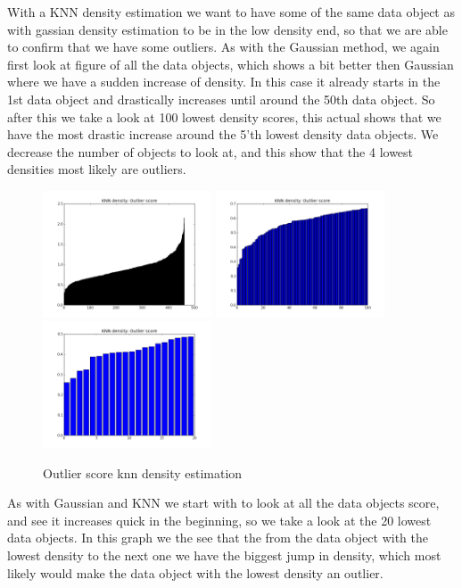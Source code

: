 With a KNN density estimation we want to have some of the same data object as with gassian density estimation to be in the low density end, so that we are able to confirm that we have some outliers. As with the Gaussian method, we again first look at figure of all the data objects, which shows a bit better then Gaussian where we have a sudden increase of density. In this case it already starts in the 1st data object and drastically increases until around the 50th data object. So after this we take a look at 100 lowest density scores, this actual shows that we have the most drastic increase around the 5'th lowest density data objects. We decrease the number of objects to look at, and this show that the 4 lowest densities most likely are outliers.

\begin{figure}[H]
\centering
\includegraphics[width=5cm, keepaspectratio=true]{pictures/knndensityEstimationAll.png}
\includegraphics[width=5cm, keepaspectratio=true]{pictures/knndensityEstimation100.png}
\includegraphics[width=5cm, keepaspectratio=true]{pictures/knndensityEstimation20.png}
\vspace{-0.4cm}
\caption{\footnotesize Outlier score knn density estimation}
\label{knn}
\end{figure}

As with Gaussian and KNN we start with to look at all the data objects score, and see it increases quick in the beginning, so we take a look at the 20 lowest data objects. In this graph we the see that the from the data object with the lowest density to the next one we have the biggest jump in density, which most likely would make the data object with the lowest density an outlier.

